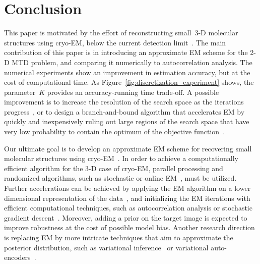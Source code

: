 \documentclass{article}
\begin{document}
\section{Conclusion}
\label{sec:conclusion}
This paper is motivated by the effort of reconstructing small~\mbox{3-D} molecular structures using \mbox{cryo-EM}, below the current detection limit~\cite{bendory2018toward}. The main contribution of this paper is in introducing an approximate EM scheme for the 2-D MTD problem, and comparing it numerically to autocorrelation analysis. The numerical experiments show an improvement in estimation accuracy, but at the cost of computational time. As Figure~\ref{fig:discretization_experiment} shows, the parameter~$K$ provides an accuracy-running time trade-off. A possible improvement is to increase the resolution of the search space as the iterations progress~\cite{lan2020multi},
or to design a branch-and-bound algorithm that accelerates EM by quickly and inexpensively ruling out large regions of the search space that  have very low probability to contain the optimum of the objective function~\cite{punjani2017cryosparc}.

Our ultimate goal is to develop an approximate EM scheme for recovering small molecular structures using \mbox{cryo-EM}~\cite{bendory2018toward}. %
In order to achieve a computationally efficient algorithm for the \mbox{3-D} case of \mbox{cryo-EM}, parallel processing and randomized algorithms, such as stochastic or online EM~\cite{nielsen2000stochastic, chen2018stochastic, liang2009online, cappe2009line, cappe2011online}, must be utilized.
Further accelerations can be achieved by applying the EM algorithm on a lower dimensional representation of the data~\cite{dvornek2015subspaceem},
and initializing the  EM iterations with efficient computational techniques, such as autocorrelation analysis or stochastic gradient descent~\cite{punjani2017cryosparc}.
 Moreover, adding a prior on the target image is expected to improve robustness at the cost of  possible model bias. Another research direction is replacing EM by more intricate techniques that aim to approximate the posterior distribution, such as variational inference~\cite{blei2017variational} or variational auto-encoders~\cite{rosenbaum2021inferring}.

\vfill
\newpage



\end{document}
